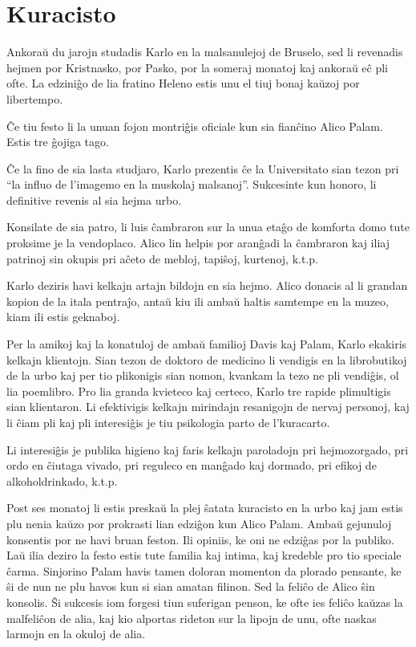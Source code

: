 \chapter{Kuracisto}

Ankoraŭ du jarojn studadis Karlo en la malsanulejoj de Bruselo, sed li revenadis hejmen por Kristnasko, por Pasko, por la someraj monatoj kaj ankoraŭ eĉ pli ofte. La edziniĝo de lia fratino Heleno estis unu el tiuj bonaj kaŭzoj por libertempo.

Ĉe tiu festo li la unuan fojon montriĝis oficiale kun sia fianĉino Alico Palam. Estis tre ĝojiga tago.

Ĉe la fino de sia lasta studjaro, Karlo prezentis ĉe la Universitato sian tezon pri ``la influo de l'imagemo en la muskolaj malsanoj''. Sukcesinte kun honoro, li definitive revenis al sia hejma urbo.

Konsilate de sia patro, li luis ĉambraron sur la unua etaĝo de komforta domo tute proksime je la vendoplaco. Alico lin helpis por aranĝadi la ĉambraron kaj iliaj patrinoj sin okupis pri aĉeto de mebloj, tapiŝoj, kurtenoj, k.t.p.

Karlo deziris havi kelkajn artajn bildojn en sia hejmo. Alico donacis al li grandan kopion de la itala pentraĵo, antaŭ kiu ili ambaŭ haltis samtempe en la muzeo, kiam ili estis geknaboj.

Per la amikoj kaj la konatuloj de ambaŭ familioj Davis kaj Palam, Karlo ekakiris kelkajn klientojn. Sian tezon de doktoro de medicino li vendigis en la librobutikoj de la urbo kaj per tio plikonigis sian nomon, kvankam la tezo ne pli vendiĝis, ol lia poemlibro. Pro lia granda kvieteco kaj certeco, Karlo tre rapide plimultigis sian klientaron. Li efektivigis kelkajn mirindajn resanigojn de nervaj personoj, kaj li ĉiam pli kaj pli interesiĝis je tiu psikologia parto de l'kuracarto.

Li interesiĝis je publika higieno kaj faris kelkajn paroladojn pri hejmozorgado, pri ordo en ĉiutaga vivado, pri reguleco en manĝado kaj dormado, pri efikoj de alkoholdrinkado, k.t.p.

Post ses monatoj li estis preskaŭ la plej ŝatata kuracisto en la urbo kaj jam estis plu nenia kaŭzo por prokrasti lian edziĝon kun Alico Palam. Ambaŭ gejunuloj konsentis por ne havi bruan feston. Ili opiniis, ke oni ne edziĝas por la publiko. Laŭ ilia deziro la festo estis tute familia kaj intima, kaj kredeble pro tio speciale ĉarma. Sinjorino Palam havis tamen doloran momenton da plorado pensante, ke ŝi de nun ne plu havos kun si sian amatan filinon. Sed la feliĉo de Alico ŝin konsolis. Ŝi sukcesis iom forgesi tiun suferigan penson, ke ofte ies feliĉo kaŭzas la malfeliĉon de alia, kaj kio alportas rideton sur la lipojn de unu, ofte naskas larmojn en la okuloj de alia.

